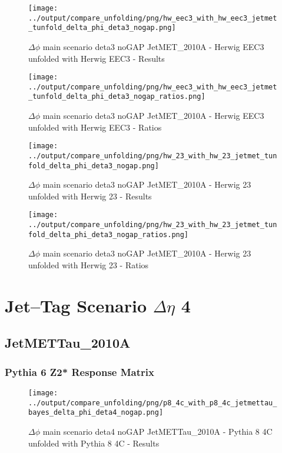 \documentclass[11pt]{book}
\begin{document}
\begin{figure}[ht]
\centering
\texttt{[image: ../output/compare\_unfolding/png/hw\_eec3\_with\_hw\_eec3\_jetmet\_tunfold\_delta\_phi\_deta3\_nogap.png]}
\caption{$\Delta\phi$ main scenario deta3 noGAP JetMET\_2010A - Herwig EEC3 unfolded with Herwig EEC3 - Results}
\label{hw_eec3_hw_eec3_jetmet_tunfold_delta_phi_deta3_nogap_a}
\end{figure}

\begin{figure}[ht]
\centering
\texttt{[image: ../output/compare\_unfolding/png/hw\_eec3\_with\_hw\_eec3\_jetmet\_tunfold\_delta\_phi\_deta3\_nogap\_ratios.png]}
\caption{$\Delta\phi$ main scenario deta3 noGAP JetMET\_2010A - Herwig EEC3 unfolded with Herwig EEC3 - Ratios}
\label{hw_eec3_hw_eec3_jetmet_tunfold_delta_phi_deta3_nogap_b}
\end{figure}

\begin{figure}[ht]
\centering
\texttt{[image: ../output/compare\_unfolding/png/hw\_23\_with\_hw\_23\_jetmet\_tunfold\_delta\_phi\_deta3\_nogap.png]}
\caption{$\Delta\phi$ main scenario deta3 noGAP JetMET\_2010A - Herwig 23 unfolded with Herwig 23 - Results}
\label{hw_23_hw_23_jetmet_tunfold_delta_phi_deta3_nogap_a}
\end{figure}

\begin{figure}[ht]
\centering
\texttt{[image: ../output/compare\_unfolding/png/hw\_23\_with\_hw\_23\_jetmet\_tunfold\_delta\_phi\_deta3\_nogap\_ratios.png]}
\caption{$\Delta\phi$ main scenario deta3 noGAP JetMET\_2010A - Herwig 23 unfolded with Herwig 23 - Ratios}
\label{hw_23_hw_23_jetmet_tunfold_delta_phi_deta3_nogap_b}
\end{figure}





\newpage
\chapter{Jet--Tag Scenario $\Delta\eta$ 4}
\section{JetMETTau\_2010A}
\subsection{Pythia 6 Z2* Response Matrix}


\begin{figure}[ht]
\centering
\texttt{[image: ../output/compare\_unfolding/png/p8\_4c\_with\_p8\_4c\_jetmettau\_bayes\_delta\_phi\_deta4\_nogap.png]}
\caption{$\Delta\phi$ main scenario deta4 noGAP JetMETTau\_2010A - Pythia 8 4C unfolded with Pythia 8 4C - Results}
\label{p8_p8_jetmettau_bayes_delta_phi_deta4_nogap_a}
\end{figure}
\end{document}
